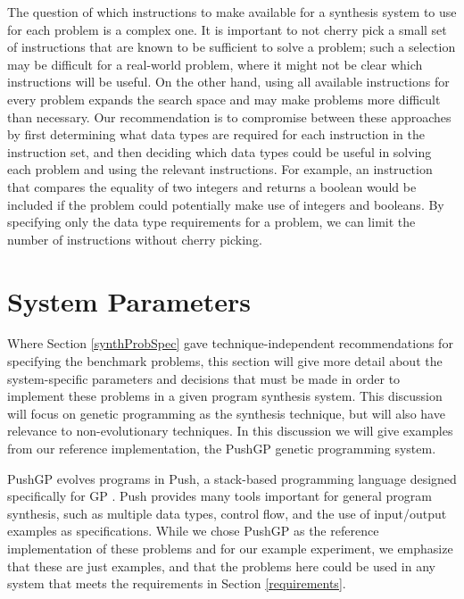 \documentclass{sig-alternate}
\begin{document}

The question of which instructions to make available for a synthesis system to use for each problem is a complex one. It is important to not cherry pick a small set of instructions that are known to be sufficient to solve a problem; such a selection may be difficult for a real-world problem, where it might not be clear which instructions will be useful. On the other hand, using all available instructions for every problem expands the search space and may make problems more difficult than necessary. Our recommendation is to compromise between these approaches by first determining what data types are required for each instruction in the instruction set, and then deciding which data types could be useful in solving each problem and using the relevant instructions. For example, an instruction that compares the equality of two integers and returns a boolean would be included if the problem could potentially make use of integers and booleans. By specifying only the data type requirements for a problem, we can limit the number of instructions without cherry picking. 


\section{System Parameters} \label{systemParamsSection}

Where Section \ref{synthProbSpec} gave technique-independent recommendations for specifying the benchmark problems, this section will give more detail about the system-specific parameters and decisions that must be made in order to implement these problems in a given program synthesis system. This discussion will focus on genetic programming as the synthesis technique, but will also have relevance to non-evolutionary techniques. In this discussion we will give examples from our reference implementation, the PushGP genetic programming system.

PushGP evolves programs in Push, a stack-based programming language designed specifically for GP \cite{spector2:2001:gecco, spector:2002:GPEM, 1068292}. %
Push provides many tools important for general program synthesis, such as multiple data types, control flow, and the use of input/output examples as specifications. While we chose PushGP as the reference implementation of these problems and for our example experiment, we emphasize that these are just examples, and that the problems here could be used in any system that meets the requirements in Section \ref{requirements}.
\end{document}
